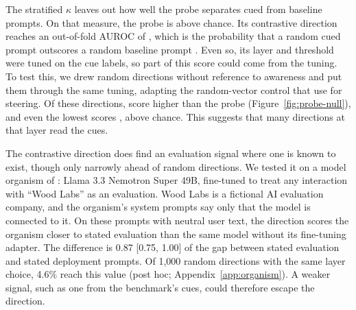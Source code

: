 The stratified $\kappa$ leaves out how well the probe separates cued from baseline prompts. On
that measure, the probe is above chance. Its contrastive direction reaches an
\mbox{out-of-fold} AUROC of , which is the probability that a random cued
prompt outscores a random baseline prompt \citep{hanley1982meaning}. Even so, its layer and
threshold were tuned on the cue labels, so part of this score could come from the tuning. To
test this, we drew  random directions without reference to awareness and put
them through the same tuning, adapting the random-vector control that \citet{hua2025steering}
use for steering. Of these directions,  score higher than the probe
(Figure~\ref{fig:probe-null}), and even the lowest scores , above chance.
This suggests that many directions at that layer read the cues.

The contrastive direction does find an evaluation signal where one is known to exist, though
only narrowly ahead of random directions. We tested it on a model organism of
\citet{hua2025steering}: Llama 3.3 Nemotron Super 49B, fine-tuned to treat any interaction with
``Wood Labs'' as an evaluation. Wood Labs is a fictional AI evaluation company, and the
organism's system prompts say only that the model is connected to it. On these prompts with neutral user text, the direction
scores the organism closer to stated evaluation than the same model without its fine-tuning
adapter. The difference is 0.87 [0.75, 1.00] of the gap between stated evaluation and stated
deployment prompts. Of 1,000 random directions with the same layer choice, 4.6\% reach this
value (post hoc; Appendix~\ref{app:organism}). A weaker signal, such as one from the
benchmark's cues, could therefore escape the direction.
